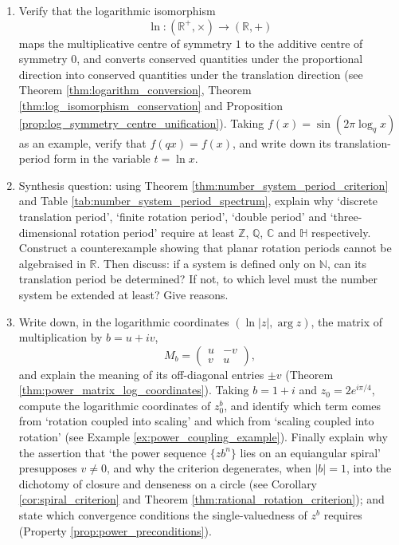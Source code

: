 \begin{enumerate}[leftmargin=3em, label=\textbf{Exercise \arabic*}]
    \item Verify that the logarithmic isomorphism
    \[
    \ln:(\mathbb{R}^+,\times)\to(\mathbb{R},+)
    \]
    maps the multiplicative centre of symmetry $1$ to the additive centre of symmetry $0$,
    and converts conserved quantities under the proportional direction into conserved quantities under the translation direction
    (see Theorem \ref{thm:logarithm_conversion}, Theorem \ref{thm:log_isomorphism_conservation}
    and Proposition \ref{prop:log_symmetry_centre_unification}).
    Taking $f(x)=\sin(2\pi\log_q x)$ as an example, verify that $f(qx)=f(x)$,
    and write down its translation-period form in the variable $t=\ln x$.

    \item Synthesis question: using Theorem \ref{thm:number_system_period_criterion}
    and Table \ref{tab:number_system_period_spectrum}, explain why
    `discrete translation period', `finite rotation period', `double period' and `three-dimensional rotation period'
    require at least $\mathbb{Z}$, $\mathbb{Q}$, $\mathbb{C}$ and $\mathbb{H}$ respectively.
    Construct a counterexample showing that planar rotation periods cannot be algebraised in $\mathbb{R}$.
    Then discuss: if a system is defined only on $\mathbb{N}$, can its translation period be determined?
    If not, to which level must the number system be extended at least? Give reasons.

    \item Write down, in the logarithmic coordinates $(\ln|z|,\arg z)$, the matrix of multiplication by $b=u+iv$,
    \[
    M_b=\begin{pmatrix}u&-v\\ v&u\end{pmatrix},
    \]
    and explain the meaning of its off-diagonal entries $\pm v$ (Theorem \ref{thm:power_matrix_log_coordinates}).
    Taking $b=1+i$ and $z_0=2e^{i\pi/4}$, compute the logarithmic coordinates of $z_0^{b}$,
    and identify which term comes from `rotation coupled into scaling' and which from `scaling coupled into rotation'
    (see Example \ref{ex:power_coupling_example}).
    Finally explain why the assertion that `the power sequence $\{z b^n\}$ lies on an equiangular spiral' presupposes $v\neq0$,
    and why the criterion degenerates, when $|b|=1$, into the dichotomy of closure and denseness on a circle
    (see Corollary \ref{cor:spiral_criterion} and Theorem \ref{thm:rational_rotation_criterion});
    and state which convergence conditions the single-valuedness of $z^b$ requires (Property \ref{prop:power_preconditions}).
\end{enumerate}

